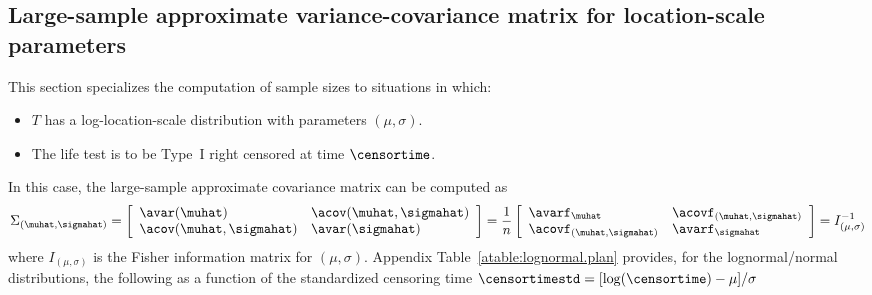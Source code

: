 \subsection{Large-sample approximate variance-covariance 
matrix for location-scale parameters}
\label{section:large.sample.vcv}
This section specializes the computation of sample sizes to situations in
which: 
\begin{itemize} 
\item $T$ has a log-location-scale distribution
with parameters $(\mu, \sigma)$.  
\item The life test is to be
Type~I right censored at time $\censortime$.  
\end{itemize} In this
case, the large-sample approximate 
covariance matrix can be computed as 
\begin{displaymath}
\Sigma_{(\muhat,\sigmahat)}
=
\left [
 \begin{array}{ll}
  \avar(\muhat) &  \acov(\muhat, \sigmahat) \\
  \acov(\muhat, \sigmahat) &  \avar(\sigmahat)
 \end{array}
\right ]
=
\frac{1}{n}
\left [
 \begin{array}{ll}
  \avarf_{\muhat} &  \acovf_{(\muhat, \sigmahat)} \\
  \acovf_{(\muhat, \sigmahat)} &  \avarf_{\sigmahat}
 \end{array}
\right ] = I^{-1}_{(\mu,\sigma)}
\end{displaymath}
where $I_{(\mu,\sigma)}$
is the Fisher information matrix for $(\mu,\sigma)$.
Appendix Table~\ref{atable:lognormal.plan} provides, for the 
lognormal/normal distributions,
the following as a function of the standardized censoring time
$\censortimestd = [\log(\censortime)-\mu]/\sigma$

